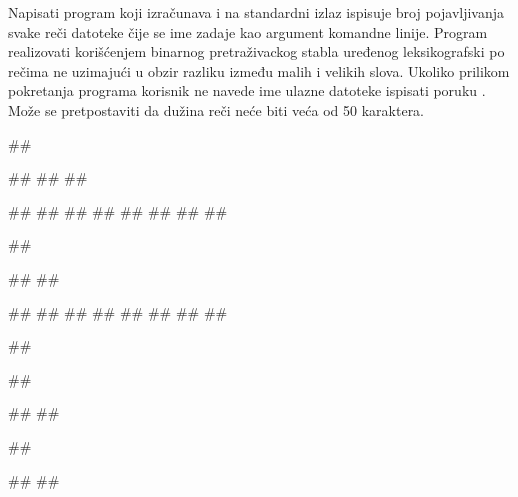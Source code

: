 \begin{Answer}[ref=701]
\end{Answer}


\begin{Exercise}[label=702]
Napisati program koji izračunava i na standardni izlaz ispisuje broj pojavljivanja svake reči datoteke čije se ime zadaje kao argument komandne linije. Program realizovati korišćenjem binarnog pretraživackog stabla uređenog leksikografski po rečima ne uzimajući u obzir razliku između malih i velikih slova. Ukoliko prilikom pokretanja programa korisnik ne navede ime ulazne datoteke ispisati poruku . Može se pretpostaviti da dužina reči neće biti veća od 50 karaktera.

\begin{miditest}
\begin{test}{1}
##
  
##
##
##

#\naslovIzlaz#
##
##
##
##
##
#\izlaz{}#
##
\end{test}
\end{miditest}
\begin{miditest}
\begin{test}{2}
##

##
##

#\naslovIzlaz#
##
##
##
##
#\izlaz{}#
##
##
\end{test}
\end{miditest}

\begin{miditest}
\begin{test}{3}
##

##

#\naslovInt#
##
\end{test}
\end{miditest}
\begin{miditest}
\begin{test}{4}
##
  
#\naslovIzlaz#
##
\end{test}
\end{miditest}


\end{Exercise}


